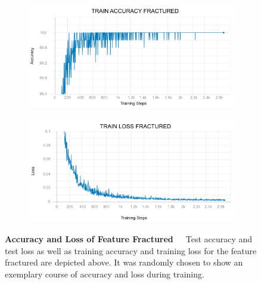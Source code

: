 \begin{figure}[!htb]
	\begin{subfigure}{0.49\textwidth}
		\includegraphics[width=\linewidth]{Figures/appendix/fractured_train_accuracy.png} 
	\end{subfigure}
	\begin{subfigure}{0.49\textwidth}
		\includegraphics[width=\linewidth]{Figures/appendix/fractured_train_loss.png}
	\end{subfigure}
    \caption[Single-Label CNN Accuracy and Loss]{\textbf{Accuracy and Loss of Feature Fractured}~~~Test accuracy and test loss as well as training accuracy and training loss for the feature fractured are depicted above. It was randomly chosen to show an exemplary course of accuracy and loss during training.}
    \label{fig:ExamplePlotsFractured}
\end{figure}